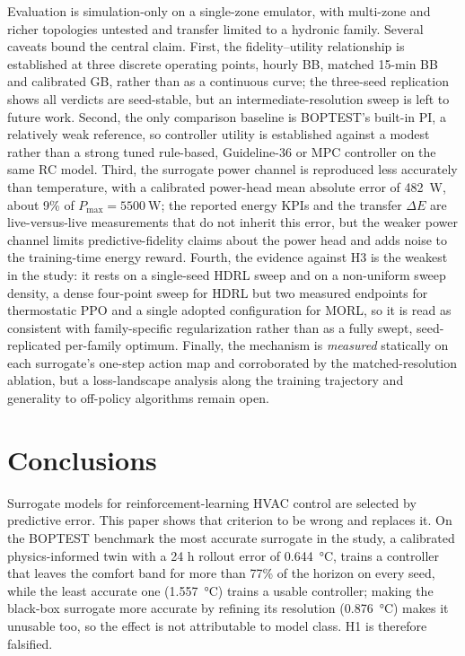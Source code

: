 \documentclass[energies,article,submit,moreauthors]{Definitions/mdpi}
\begin{document}
Evaluation is simulation-only on a single-zone emulator, with multi-zone and richer topologies
untested and transfer limited to a hydronic family. Several caveats bound the central claim. First,
the fidelity--utility relationship is established at three discrete operating points, hourly BB,
matched 15-min BB and calibrated GB, rather than as a continuous curve; the three-seed replication
shows all verdicts are seed-stable, but an intermediate-resolution sweep is left to future work.
Second, the only comparison baseline is BOPTEST's built-in PI, a relatively weak reference, so
controller utility is established against a modest rather than a strong tuned rule-based,
Guideline-36 or MPC controller on the same RC model. Third, the surrogate power channel is
reproduced less accurately than temperature, with a calibrated power-head mean absolute error of
\SI{482}{\watt}, about 9\% of $P_{\max}=\SI{5500}{\watt}$; the reported energy KPIs and the transfer
$\Delta E$ are live-versus-live measurements that do not inherit this error, but the weaker power
channel limits predictive-fidelity claims about the power head and adds noise to the training-time
energy reward. Fourth, the evidence against H3 is the weakest in the study: it rests on a
single-seed HDRL sweep and on a non-uniform sweep density, a dense four-point sweep for HDRL but two
measured endpoints for thermostatic PPO and a single adopted configuration for MORL, so it is read
as consistent with family-specific regularization rather than as a fully swept, seed-replicated
per-family optimum. Finally, the mechanism is
\emph{measured} statically on each surrogate's one-step action map and corroborated by the
matched-resolution ablation, but a loss-landscape analysis along the training trajectory and
generality to off-policy algorithms remain open.


\section{Conclusions}\label{sec:conclusions}

Surrogate models for reinforcement-learning HVAC control are selected by predictive error. This
paper shows that criterion to be wrong and replaces it. On the BOPTEST benchmark the most accurate
surrogate in the study, a calibrated physics-informed twin with a 24 h rollout error of
\SI{0.644}{\celsius}, trains a controller that leaves the comfort band for more than 77\% of the
horizon on every seed, while the least accurate one (\SI{1.557}{\celsius}) trains a usable
controller; making the black-box surrogate more accurate by refining its resolution
(\SI{0.876}{\celsius}) makes it unusable too, so the effect is not attributable to model class. H1
is therefore falsified.
\end{document}
